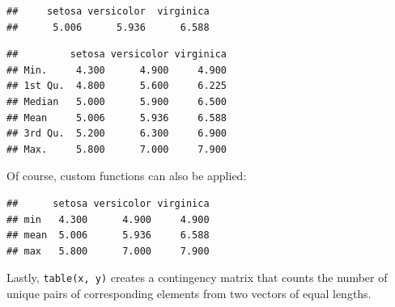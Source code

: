 \documentclass[10pt,b5paper,krantz1]{krantz}
\newenvironment{Shaded}{\begin{snugshade}}{\end{snugshade}}
\newcommand{\CommentTok}[1]{\textcolor[rgb]{0.37,0.37,0.37}{\textit{#1}}}
\newcommand{\ControlFlowTok}[1]{\textcolor[rgb]{0.27,0.27,0.27}{\textbf{#1}}}
\newcommand{\DataTypeTok}[1]{\textcolor[rgb]{0.27,0.27,0.27}{#1}}
\newcommand{\KeywordTok}[1]{\textcolor[rgb]{0.27,0.27,0.27}{\textbf{#1}}}
\newcommand{\NormalTok}[1]{#1}
\newcommand{\OperatorTok}[1]{\textcolor[rgb]{0.43,0.43,0.43}{\textbf{#1}}}
\newcommand{\StringTok}[1]{\textcolor[rgb]{0.5,0.5,0.5}{#1}}
\begin{document}
\begin{verbatim}
##     setosa versicolor  virginica 
##      5.006      5.936      6.588
\end{verbatim}

\begin{Shaded}
\end{Shaded}

\begin{verbatim}
##         setosa versicolor virginica
## Min.     4.300      4.900     4.900
## 1st Qu.  4.800      5.600     6.225
## Median   5.000      5.900     6.500
## Mean     5.006      5.936     6.588
## 3rd Qu.  5.200      6.300     6.900
## Max.     5.800      7.000     7.900
\end{verbatim}

Of course, custom functions can also be applied:

\begin{Shaded}
\end{Shaded}

\begin{verbatim}
##      setosa versicolor virginica
## min   4.300      4.900     4.900
## mean  5.006      5.936     6.588
## max   5.800      7.000     7.900
\end{verbatim}

Lastly, \texttt{table(x,\ y)} creates a contingency matrix that
counts the number of unique pairs of corresponding elements
from two vectors of equal lengths.

\begin{Shaded}
\end{Shaded}
\end{document}
